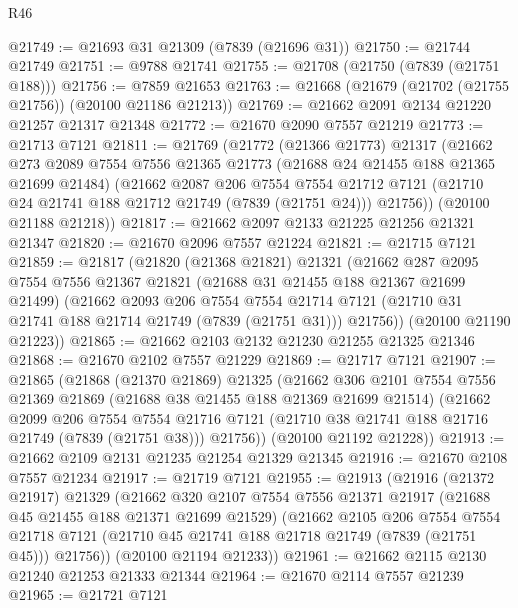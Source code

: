\begin{lexlean}{R46}
\begin{coremodule}
@21749 := @21693 @31 @21309 (@7839 (@21696 @31))
@21750 := @21744 @21749
@21751 := @9788 @21741
@21755 := @21708 (@21750 (@7839 (@21751 @188)))
@21756 := @7859 @21653
@21763 := @21668 (@21679 (@21702 (@21755 @21756)) (@20100 @21186 @21213))
@21769 := @21662 @2091 @2134 @21220 @21257 @21317 @21348
@21772 := @21670 @2090 @7557 @21219
@21773 := @21713 @7121
@21811 := @21769
    (@21772
      (@21366 @21773)
      @21317
      (@21662
        @273
        @2089
        @7554
        @7556
        @21365
        @21773
        (@21688 @24 @21455 @188 @21365 @21699 @21484)
        (@21662
          @2087
          @206
          @7554
          @7554
          @21712
          @7121
          (@21710 @24 @21741 @188 @21712 @21749 (@7839 (@21751 @24)))
          @21756))
      (@20100 @21188 @21218))
@21817 := @21662 @2097 @2133 @21225 @21256 @21321 @21347
@21820 := @21670 @2096 @7557 @21224
@21821 := @21715 @7121
@21859 := @21817
    (@21820
      (@21368 @21821)
      @21321
      (@21662
        @287
        @2095
        @7554
        @7556
        @21367
        @21821
        (@21688 @31 @21455 @188 @21367 @21699 @21499)
        (@21662
          @2093
          @206
          @7554
          @7554
          @21714
          @7121
          (@21710 @31 @21741 @188 @21714 @21749 (@7839 (@21751 @31)))
          @21756))
      (@20100 @21190 @21223))
@21865 := @21662 @2103 @2132 @21230 @21255 @21325 @21346
@21868 := @21670 @2102 @7557 @21229
@21869 := @21717 @7121
@21907 := @21865
    (@21868
      (@21370 @21869)
      @21325
      (@21662
        @306
        @2101
        @7554
        @7556
        @21369
        @21869
        (@21688 @38 @21455 @188 @21369 @21699 @21514)
        (@21662
          @2099
          @206
          @7554
          @7554
          @21716
          @7121
          (@21710 @38 @21741 @188 @21716 @21749 (@7839 (@21751 @38)))
          @21756))
      (@20100 @21192 @21228))
@21913 := @21662 @2109 @2131 @21235 @21254 @21329 @21345
@21916 := @21670 @2108 @7557 @21234
@21917 := @21719 @7121
@21955 := @21913
    (@21916
      (@21372 @21917)
      @21329
      (@21662
        @320
        @2107
        @7554
        @7556
        @21371
        @21917
        (@21688 @45 @21455 @188 @21371 @21699 @21529)
        (@21662
          @2105
          @206
          @7554
          @7554
          @21718
          @7121
          (@21710 @45 @21741 @188 @21718 @21749 (@7839 (@21751 @45)))
          @21756))
      (@20100 @21194 @21233))
@21961 := @21662 @2115 @2130 @21240 @21253 @21333 @21344
@21964 := @21670 @2114 @7557 @21239
@21965 := @21721 @7121

\end{coremodule}
\end{lexlean}
